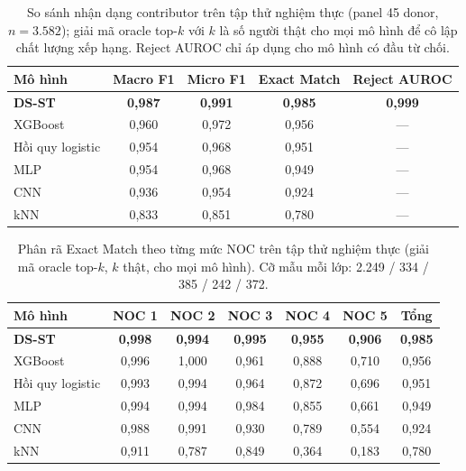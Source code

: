 \documentclass[12pt,a4paper]{article}
\begin{document}
\begin{table}[H]
\centering
\caption{So sánh nhận dạng contributor trên tập thử nghiệm thực (panel 45 donor, \(n=3.582\)); giải mã oracle top-\(k\) với \(k\) là số người thật cho mọi mô hình để cô lập chất lượng xếp hạng. Reject AUROC chỉ áp dụng cho mô hình có đầu từ chối.}
\label{tab:contrib_baseline}
\small
\begin{tabular}{lcccc}
\toprule
\textbf{Mô hình} & \textbf{Macro F1} & \textbf{Micro F1} & \textbf{Exact Match} & \textbf{Reject AUROC} \\
\midrule
\textbf{DS-ST} & \textbf{0,987} & \textbf{0,991} & \textbf{0,985} & \textbf{0,999} \\
XGBoost & 0,960 & 0,972 & 0,956 & --- \\
Hồi quy logistic & 0,954 & 0,968 & 0,951 & --- \\
MLP & 0,954 & 0,968 & 0,949 & --- \\
CNN & 0,936 & 0,954 & 0,924 & --- \\
kNN & 0,833 & 0,851 & 0,780 & --- \\
\bottomrule
\end{tabular}
\end{table}

\begin{table}[H]
\centering
\caption{Phân rã Exact Match theo từng mức NOC trên tập thử nghiệm thực (giải mã oracle top-\(k\), \(k\) thật, cho mọi mô hình). Cỡ mẫu mỗi lớp: 2.249 / 334 / 385 / 242 / 372.}
\label{tab:contrib_pernoc}
\small
\begin{tabular}{lcccccc}
\toprule
\textbf{Mô hình} & \textbf{NOC 1} & \textbf{NOC 2} & \textbf{NOC 3} & \textbf{NOC 4} & \textbf{NOC 5} & \textbf{Tổng} \\
\midrule
\textbf{DS-ST} & \textbf{0,998} & \textbf{0,994} & \textbf{0,995} & \textbf{0,955} & \textbf{0,906} & \textbf{0,985} \\
XGBoost & 0,996 & 1,000 & 0,961 & 0,888 & 0,710 & 0,956 \\
Hồi quy logistic & 0,993 & 0,994 & 0,964 & 0,872 & 0,696 & 0,951 \\
MLP & 0,994 & 0,994 & 0,984 & 0,855 & 0,661 & 0,949 \\
CNN & 0,988 & 0,991 & 0,930 & 0,789 & 0,554 & 0,924 \\
kNN & 0,911 & 0,787 & 0,849 & 0,364 & 0,183 & 0,780 \\
\bottomrule
\end{tabular}
\end{table}
\end{document}
